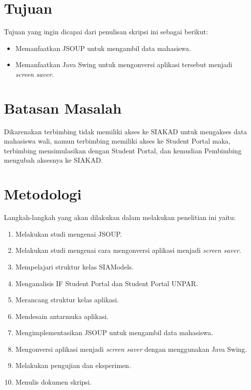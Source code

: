 \section{Tujuan}
\label{sec:tujuan}
Tujuan yang ingin dicapai dari penulisan skripsi ini sebagai berikut:
\begin{itemize}
    \item Memanfaatkan JSOUP untuk mengambil data mahasiswa.
    \item Memanfaatkan Java Swing untuk mengonversi aplikasi tersebut menjadi \textit{screen saver}.
\end{itemize}

\section{Batasan Masalah}
\label{sec:batasan}
Dikarenakan terbimbing tidak memiliki akses ke SIAKAD untuk mengakses data mahasiswa wali, namun terbimbing memiliki akses ke Student Portal maka, terbimbing mensimulasikan dengan Student Portal, dan kemudian Pembimbing mengubah aksesnya ke SIAKAD. 

\section{Metodologi}
\label{sec:metlit}
Langkah-langkah yang akan dilakukan dalam melakukan penelitian ini yaitu:
	\begin{enumerate}
		\item Melakukan studi mengenai JSOUP.
		\item Melakukan studi mengenai cara mengonversi aplikasi menjadi \textit{screen saver}.
		\item Mempelajari struktur kelas SIAModels.
		\item Menganalisis IF Student Portal dan Student Portal UNPAR.
		\item Merancang struktur kelas aplikasi.
	    \item Mendesain antarmuka aplikasi.
	    \item Mengimplementasikan JSOUP untuk mengambil data mahasiswa.
        \item Mengonversi aplikasi menjadi \textit{screen saver} dengan menggunakan Java Swing. 
		\item Melakukan pengujian dan eksperimen.
		\item Menulis dokumen skripsi.
	\end{enumerate}

